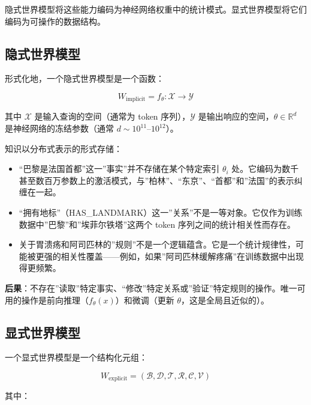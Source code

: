 \documentclass[11pt,a4paper]{ctexart}
\begin{document}
隐式世界模型将这些能力编码为神经网络权重中的统计模式。显式世界模型将它们编码为可操作的数据结构。

\subsection{隐式世界模型}\label{ux9690ux5f0fux4e16ux754cux6a21ux578b}

形式化地，一个隐式世界模型是一个函数：

\[W_{\text{implicit}} = f_\theta: \mathcal{X} \rightarrow \mathcal{Y}\]

其中 \(\mathcal{X}\) 是输入查询的空间（通常为 token
序列），\(\mathcal{Y}\) 是输出响应的空间，\(\theta \in \mathbb{R}^d\)
是神经网络的冻结参数（通常 \(d \sim 10^{11}\)--\(10^{12}\)）。

知识以分布式表示的形式存储：

\begin{itemize}
\tightlist
\item
  ``巴黎是法国首都''这一''事实''并不存储在某个特定索引 \(\theta_i\)
  处。它编码为数千甚至数百万参数上的激活模式，与''柏林''、``东京''、``首都''和''法国''的表示纠缠在一起。
\item
  ``拥有地标''（HAS\_LANDMARK）这一''关系''不是一等对象。它仅作为训练数据中''巴黎''和''埃菲尔铁塔''这两个
  token 序列之间的统计相关性而存在。
\item
  关于胃溃疡和阿司匹林的''规则''不是一个逻辑蕴含。它是一个统计规律性，可能被更强的相关性覆盖------例如，如果''阿司匹林缓解疼痛''在训练数据中出现得更频繁。
\end{itemize}

\textbf{后果}：不存在''读取''特定事实、``修改''特定关系或''验证''特定规则的操作。唯一可用的操作是前向推理（\(f_\theta(x)\)）和微调（更新
\(\theta\)，这是全局且近似的）。

\subsection{显式世界模型}\label{ux663eux5f0fux4e16ux754cux6a21ux578b}

一个显式世界模型是一个结构化元组：

\[W_{\text{explicit}} = (\mathcal{B}, \mathcal{D}, \mathcal{T}, \mathcal{R}, \mathcal{C}, \mathcal{V})\]

其中：
\end{document}

